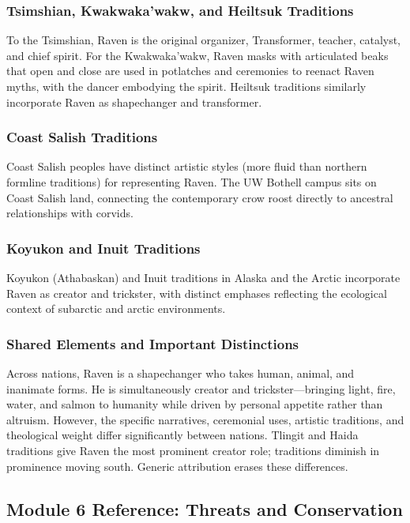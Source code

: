 \documentclass[11pt,letterpaper]{article}
\begin{document}
\subsubsection{Tsimshian, Kwakwaka'wakw, and Heiltsuk Traditions}

To the Tsimshian, Raven is the original organizer, Transformer, teacher, catalyst, and chief spirit. For the Kwakwaka'wakw, Raven masks with articulated beaks that open and close are used in potlatches and ceremonies to reenact Raven myths, with the dancer embodying the spirit. Heiltsuk traditions similarly incorporate Raven as shapechanger and transformer.

\subsubsection{Coast Salish Traditions}

Coast Salish peoples have distinct artistic styles (more fluid than northern formline traditions) for representing Raven. The UW Bothell campus sits on Coast Salish land, connecting the contemporary crow roost directly to ancestral relationships with corvids.

\subsubsection{Koyukon and Inuit Traditions}

Koyukon (Athabaskan) and Inuit traditions in Alaska and the Arctic incorporate Raven as creator and trickster, with distinct emphases reflecting the ecological context of subarctic and arctic environments.

\subsubsection{Shared Elements and Important Distinctions}

Across nations, Raven is a shapechanger who takes human, animal, and inanimate forms. He is simultaneously creator and trickster---bringing light, fire, water, and salmon to humanity while driven by personal appetite rather than altruism. However, the specific narratives, ceremonial uses, artistic traditions, and theological weight differ significantly between nations. Tlingit and Haida traditions give Raven the most prominent creator role; traditions diminish in prominence moving south. Generic attribution erases these differences.

\subsection{Module 6 Reference: Threats and Conservation}
\end{document}
